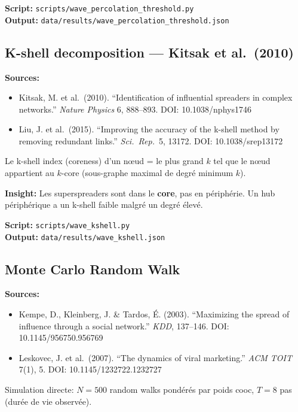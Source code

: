 \documentclass[11pt,a4paper]{article}
\begin{document}
\textbf{Script:} \texttt{scripts/wave\_percolation\_threshold.py} \\
\textbf{Output:} \texttt{data/results/wave\_percolation\_threshold.json}

\subsection{K-shell decomposition --- Kitsak et al.\ (2010)}

\textbf{Sources:}
\begin{itemize}
\item Kitsak, M. et al.\ (2010). ``Identification of influential spreaders in complex networks.''
  \textit{Nature Physics} 6, 888--893. DOI: 10.1038/nphys1746
\item Liu, J. et al.\ (2015). ``Improving the accuracy of the k-shell method by removing
  redundant links.'' \textit{Sci.\ Rep.}\ 5, 13172. DOI: 10.1038/srep13172
\end{itemize}

Le k-shell index (coreness) d'un n\oe ud = le plus grand $k$ tel que le n\oe ud
appartient au $k$-core (sous-graphe maximal de degr\'e minimum $k$).

\textbf{Insight:} Les superspreaders sont dans le \textbf{core}, pas en p\'eriph\'erie.
Un hub p\'eriph\'erique a un k-shell faible malgr\'e un degr\'e \'elev\'e.

\textbf{Script:} \texttt{scripts/wave\_kshell.py} \\
\textbf{Output:} \texttt{data/results/wave\_kshell.json}

\subsection{Monte Carlo Random Walk}

\textbf{Sources:}
\begin{itemize}
\item Kempe, D., Kleinberg, J. \& Tardos, \'E. (2003). ``Maximizing the spread of influence
  through a social network.'' \textit{KDD}, 137--146. DOI: 10.1145/956750.956769
\item Leskovec, J. et al.\ (2007). ``The dynamics of viral marketing.''
  \textit{ACM TOIT} 7(1), 5. DOI: 10.1145/1232722.1232727
\end{itemize}

Simulation directe: $N=500$ random walks pond\'er\'es par poids cooc, $T=8$ pas (dur\'ee de vie observ\'ee).
\end{document}
